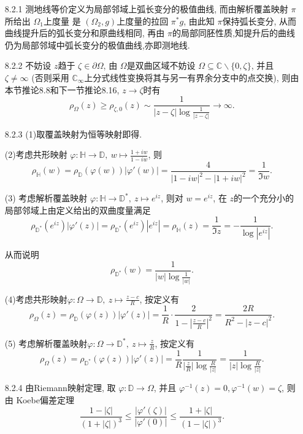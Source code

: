 \begin{itemize}
    
    \item[8.2.1] 测地线等价定义为局部邻域上弧长变分的极值曲线, 
    而由解析覆盖映射 $\pi$所给出 $\Omega_1$上度量
    是 $(\Omega_2,g)$上度量的拉回 $\pi^* g$, 
    由此知 $\pi$保持弧长变分, 从而曲线提升后的弧长变分和原曲线相同, 
    再由 $\pi$的局部同胚性质,知提升后的曲线仍为局部邻域中弧长变分的极值曲线,亦即测地线.

    \item[8.2.2] 不妨设 $z$趋于 $\zeta \in \partial\Omega$, 
    由 $\Omega$是双曲区域不妨设 $\Omega \subseteq  \mathbb{C}\backslash \{0,\zeta\}$,
    并且  $\zeta \ne \infty$
    (否则采用 $\mathbb{C}_\infty$上分式线性变换将其与另一有界余分支中的点交换), 
    则由本节推论8.8和下一节推论8.16, $z\to \zeta $时有
    $$\rho_\Omega(z)\ge \rho_{\zeta,0}(z)
    \sim \frac{1}{|z-\zeta|\log \frac{1}{|z-\zeta|}}\to \infty.$$

    
    \item[8.2.3] (1)取覆盖映射为恒等映射即得.
    
    (2)考虑共形映射 $\varphi: \mathbb{H}\to \mathbb{D},
    \ w\mapsto \frac{1+iw}{1-iw}$, 则
    $$\rho_{\mathbb{H}}(w) = \rho_{\mathbb{D}}(\varphi(w))|\varphi'(w)| 
    = \frac{4}{|1-iw|^2-|1+iw|^2} = \frac{1}{\Im w}.$$

    (3) 考虑解析覆盖映射 $\varphi: \mathbb{H}\to \mathbb{D}^*,\ z\mapsto e^{iz}$, 
    则对 $w = e^{iz}$, 在 $z$的一个充分小的局部邻域上由定义给出的双曲度量满足
    $$\rho_{\mathbb{D}^*}(e^{iz})|\varphi'(z)| 
    =\rho_{\mathbb{D}^*}(e^{iz})|e^{iz}| = \rho_{\mathbb{H}}(z) 
    = \frac{1}{\Im z} =- \frac{1}{\log|e^{iz}|}.$$

    从而说明  $$\rho_{\mathbb{D}^*}(w) = \frac{1}{|w|\log \frac{1}{|w|}}.$$

    (4)考虑共形映射$\varphi: \Omega\to \mathbb{D},\ z\mapsto \frac{z-c}{R}$, 
    按定义有
    $$ \rho_\Omega(z)= \rho_{\mathbb{D}}(\varphi(z))|\varphi'(z)| 
    = \frac{1}{R}\cdot \frac{2}{1-|\frac{z-c}{R}|^2} = \frac{2R}{R^2-|z-c|^2} .$$

    (5) 考虑解析覆盖映射$\varphi: \Omega\to \mathbb{D}^*,\ z\mapsto \frac{z}{R}$, 按定义有
    $$  \rho_\Omega(z)= \rho_{\mathbb{D}^*}(\varphi(z))|\varphi'(z)| 
    = \frac{1}{R} \frac{1}{\big|\frac{z}{R}\big|\log \frac{R}{|z|}} 
    = \frac{1}{|z|\log \frac{R}{|z|}}.$$

    \item[8.2.4]
    由Riemann映射定理, 取 $\varphi: \mathbb{D}\to \Omega$,
    并且 $\varphi^{-1}(z)=0, \varphi^{-1}(w) = \zeta$,  则由 Koebe偏差定理  
    $$  \frac{1-|\zeta|}{(1+|\zeta|)^3}
    \le\frac{|\varphi'(\zeta)|}{|\varphi'(0)|}
    \le \frac{1+|\zeta|}{(1-|\zeta|)^3}.  $$


\end{itemize}
